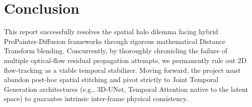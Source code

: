 \documentclass[10pt,twocolumn,letterpaper]{article}
\begin{document}
\section{Conclusion}
This report successfully resolves the spatial halo dilemma facing hybrid ProPainter-Diffusion frameworks through rigorous mathematical Distance Transform blending. Concurrently, by thoroughly chronicling the failure of multiple optical-flow residual propagation attempts, we permanently rule out 2D flow-tracking as a viable temporal stabilizer. Moving forward, the project must abandon post-hoc spatial stitching and pivot strictly to Joint Temporal Generation architectures (e.g., 3D-UNet, Temporal Attention native to the latent space) to guarantee intrinsic inter-frame physical consistency.
\end{document}
